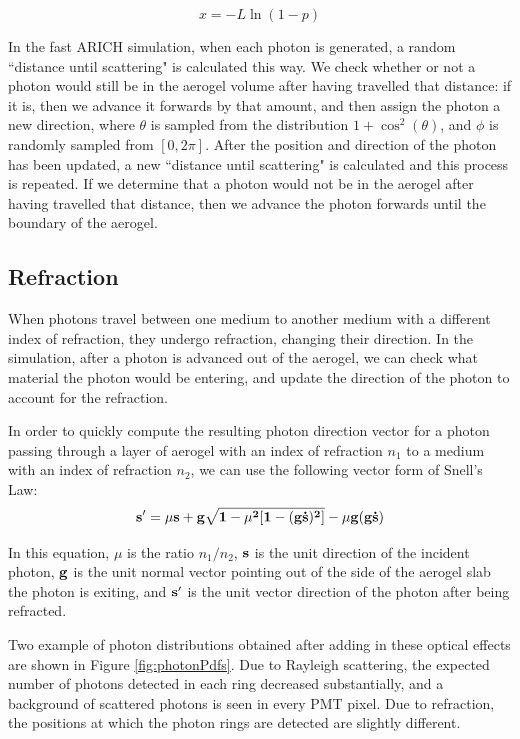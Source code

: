 \begin{equation}
x =   -L\ln(1-p)
  \label{eq:randomScat}
\end{equation}

In the fast ARICH simulation, when each photon is generated, a random ``distance until scattering" is calculated this way. 
We check whether or not a photon would still be in the aerogel volume after having travelled that distance: if it is, then we advance it forwards by that amount, and then assign the photon a new direction, where $\theta$ is sampled from the distribution $1 + \cos^2(\theta)$, and $\phi$ is randomly sampled from $[0, 2\pi]$.
After the position and direction of the photon has been updated, a new ``distance until scattering" is calculated and this process is repeated. 
If we determine that a photon would not be in the aerogel after having travelled that distance, then we advance the photon forwards until the boundary of the aerogel.

\subsection{Refraction}
When photons travel between one medium to another medium with a different index of refraction, they undergo refraction, changing their direction.
In the simulation, after a photon is advanced out of the aerogel, we can check what material the photon would be entering, and update the direction of the photon to account for the refraction.

In order to quickly compute the resulting photon direction vector for a photon passing through a layer of aerogel with an index of refraction $n_1$ to a medium with an index of refraction $n_2$, we can use the following vector form of Snell's Law: \cite{snell}
\begin{equation}
\bf{s'} = \mu\bf{s} + \bf{g}\sqrt{1 - \mu^2[1-(\bf{g \dot s})^2]} - \mu \bf{g}(\bf{g \dot s})
\label{eq:refract}
\end{equation}

In this equation, $\mu$ is the ratio $n_1/n_2$,  $\bf{s}$ is the unit direction of the incident photon, $\bf{g}$ is the unit normal vector pointing out of the side of the aerogel slab the photon is exiting, and $\bf{s'}$ is the unit vector direction of the photon after being refracted.

Two example of photon distributions obtained after adding in these optical effects are shown in Figure \ref{fig:photonPdfs}.
Due to Rayleigh scattering, the expected number of photons detected in each ring decreased substantially, and a background of scattered photons is seen in every PMT pixel.
Due to refraction, the positions at which the photon rings are detected are slightly different.

